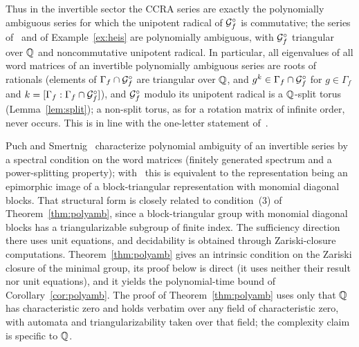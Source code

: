 Thus in the invertible sector the CCRA series are exactly the polynomially ambiguous series for which
the unipotent radical of $\mathcal{G}_f^\circ$ is commutative; the series of~\cite[Example~17]{MPS26} and of
Example~\ref{ex:heis} are polynomially ambiguous, with $\mathcal{G}_f^\circ$ triangular over $\mathbb{Q}$ and
noncommutative unipotent radical. In particular, all eigenvalues of all word matrices of an
invertible polynomially ambiguous series are roots of rationals (elements of
$\Gamma_f\cap\mathcal{G}_f^\circ$ are triangular over $\mathbb{Q}$, and $g^k\in\Gamma_f\cap\mathcal{G}_f^\circ$ for
$g\in\Gamma_f$ and $k=[\Gamma_f:\Gamma_f\cap\mathcal{G}_f^\circ]$), and $\mathcal{G}_f^\circ$ modulo its unipotent radical
is a $\mathbb{Q}$-split torus (Lemma~\ref{lem:split}); a non-split torus, as for a rotation matrix of infinite order, never occurs.
This is in line with the one-letter statement of~\cite{BFLM22}.

\begin{remark}\label{rem:polyamb-ps}
Puch and Smertnig~\cite[Theorem~1.6]{PS24} characterize polynomial ambiguity of an invertible
series by a spectral condition on the word matrices (finitely generated spectrum and a
power-splitting property); with~\cite[Theorem~1.3, Proposition~9.4]{PS24} this is equivalent to the
representation being an epimorphic image of a block-triangular representation with monomial diagonal
blocks. That structural form is closely related to condition~(3) of Theorem~\ref{thm:polyamb}, since a
block-triangular group with monomial diagonal blocks has a triangularizable subgroup of finite index.
The sufficiency direction there uses unit equations, and decidability is obtained through
Zariski-closure computations. Theorem~\ref{thm:polyamb} gives an intrinsic condition on the Zariski
closure of the minimal group, its proof below is direct (it uses neither their result nor unit
equations), and it yields the polynomial-time bound of Corollary~\ref{cor:polyamb}. The proof of Theorem~\ref{thm:polyamb}
uses only that $\mathbb{Q}$ has characteristic zero and holds verbatim over any field of characteristic zero,
with automata and triangularizability taken over that field; the complexity claim is specific to $\mathbb{Q}$.
\end{remark}

